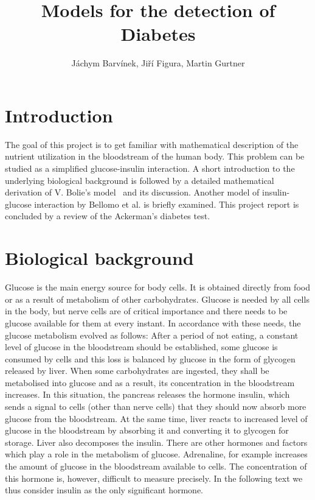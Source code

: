 \documentclass{article}
\begin{document}
\title{Models for the detection of Diabetes}
\author{J\'achym Barv\'inek, Ji\v r\'i Figura, Martin Gurtner}

\maketitle

\section{Introduction}

The goal of this project is to get familiar with mathematical description of the nutrient utilization in the bloodstream of the human body. This problem can be studied as a simplified glucose-insulin interaction.
A short introduction to the underlying biological background is followed by a detailed mathematical derivation of V. Bolie's model~\cite{bolie1961coefficients} and its discussion.
Another model of insulin-glucose interaction by Bellomo et al. is briefly examined.
This project report is concluded by a review of the Ackerman's diabetes test. 

\section{Biological background}

Glucose is the main energy source for body cells. It is obtained directly from food or as a result of metabolism of other carbohydrates. Glucose is needed by all cells in the body, but nerve cells are of critical importance and there needs
to be glucose available for them at every instant. In accordance with these needs, the glucose
metabolism evolved as follows:
After a period of not eating, a constant level of glucose in the bloodstream should be established,
some glucose is consumed by cells and this loss is balanced by glucose in the form of glycogen
released by liver. When some carbohydrates are ingested, they shall be metabolised into glucose
and as a result, its concentration in the bloodstream increases. In this situation, the pancreas
releases the hormone insulin, which sends a signal to cells (other than nerve cells) that they should
now absorb more glucose from the bloodstream. At the same time, liver reacts to increased level of 
glucose in the bloodstream by absorbing it and converting it to glycogen for storage. Liver also 
decomposes the insulin. There are other hormones and factors which play a role in the metabolism
of glucose. Adrenaline, for example increases the amount of glucose in the bloodstream available
to cells. The concentration of this hormone is, however, difficult to measure precisely.
In the following text we thus consider insulin as the only significant hormone.
\end{document}
